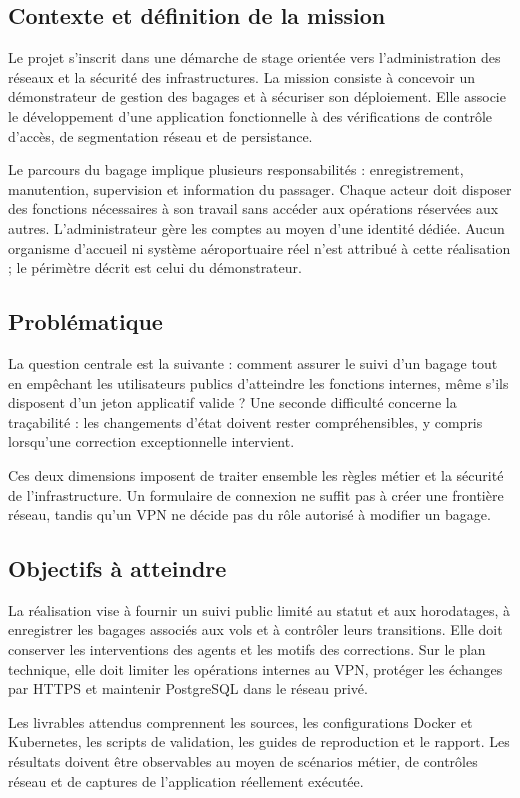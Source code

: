 \documentclass[11pt]{extarticle}
\begin{document}
\subsection{Contexte et définition de la mission}
Le projet s'inscrit dans une démarche de stage orientée vers l'administration des réseaux et la sécurité des infrastructures. La mission consiste à concevoir un démonstrateur de gestion des bagages et à sécuriser son déploiement. Elle associe le développement d'une application fonctionnelle à des vérifications de contrôle d'accès, de segmentation réseau et de persistance.

Le parcours du bagage implique plusieurs responsabilités : enregistrement, manutention, supervision et information du passager. Chaque acteur doit disposer des fonctions nécessaires à son travail sans accéder aux opérations réservées aux autres. L'administrateur gère les comptes au moyen d'une identité dédiée. Aucun organisme d'accueil ni système aéroportuaire réel n'est attribué à cette réalisation ; le périmètre décrit est celui du démonstrateur.
\subsection{Problématique}
La question centrale est la suivante : comment assurer le suivi d'un bagage tout en empêchant les utilisateurs publics d'atteindre les fonctions internes, même s'ils disposent d'un jeton applicatif valide ? Une seconde difficulté concerne la traçabilité : les changements d'état doivent rester compréhensibles, y compris lorsqu'une correction exceptionnelle intervient.

Ces deux dimensions imposent de traiter ensemble les règles métier et la sécurité de l'infrastructure. Un formulaire de connexion ne suffit pas à créer une frontière réseau, tandis qu'un VPN ne décide pas du rôle autorisé à modifier un bagage.
\subsection{Objectifs à atteindre}
La réalisation vise à fournir un suivi public limité au statut et aux horodatages, à enregistrer les bagages associés aux vols et à contrôler leurs transitions. Elle doit conserver les interventions des agents et les motifs des corrections. Sur le plan technique, elle doit limiter les opérations internes au VPN, protéger les échanges par HTTPS et maintenir PostgreSQL dans le réseau privé.

Les livrables attendus comprennent les sources, les configurations Docker et Kubernetes, les scripts de validation, les guides de reproduction et le rapport. Les résultats doivent être observables au moyen de scénarios métier, de contrôles réseau et de captures de l'application réellement exécutée.
\end{document}
